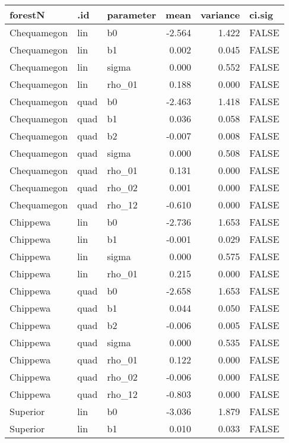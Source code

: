 \begin{table}[ht]
\begin{center}
\begin{tabular}{lllrrl}
  \hline
forestN & .id & parameter & mean & variance & ci.sig \\ 
  \hline
Chequamegon & lin & b0 & -2.564 & 1.422 & FALSE \\ 
  Chequamegon & lin & b1 & 0.002 & 0.045 & FALSE \\ 
  Chequamegon & lin & sigma & 0.000 & 0.552 & FALSE \\ 
  Chequamegon & lin & rho\_01 & 0.188 & 0.000 & FALSE \\ 
  Chequamegon & quad & b0 & -2.463 & 1.418 & FALSE \\ 
  Chequamegon & quad & b1 & 0.036 & 0.058 & FALSE \\ 
  Chequamegon & quad & b2 & -0.007 & 0.008 & FALSE \\ 
  Chequamegon & quad & sigma & 0.000 & 0.508 & FALSE \\ 
  Chequamegon & quad & rho\_01 & 0.131 & 0.000 & FALSE \\ 
  Chequamegon & quad & rho\_02 & 0.001 & 0.000 & FALSE \\ 
  Chequamegon & quad & rho\_12 & -0.610 & 0.000 & FALSE \\ 
  Chippewa & lin & b0 & -2.736 & 1.653 & FALSE \\ 
  Chippewa & lin & b1 & -0.001 & 0.029 & FALSE \\ 
  Chippewa & lin & sigma & 0.000 & 0.575 & FALSE \\ 
  Chippewa & lin & rho\_01 & 0.215 & 0.000 & FALSE \\ 
  Chippewa & quad & b0 & -2.658 & 1.653 & FALSE \\ 
  Chippewa & quad & b1 & 0.044 & 0.050 & FALSE \\ 
  Chippewa & quad & b2 & -0.006 & 0.005 & FALSE \\ 
  Chippewa & quad & sigma & 0.000 & 0.535 & FALSE \\ 
  Chippewa & quad & rho\_01 & 0.122 & 0.000 & FALSE \\ 
  Chippewa & quad & rho\_02 & -0.006 & 0.000 & FALSE \\ 
  Chippewa & quad & rho\_12 & -0.803 & 0.000 & FALSE \\ 
  Superior & lin & b0 & -3.036 & 1.879 & FALSE \\ 
  Superior & lin & b1 & 0.010 & 0.033 & FALSE \\ 

\end{tabular}
\end{center}
\end{table}
